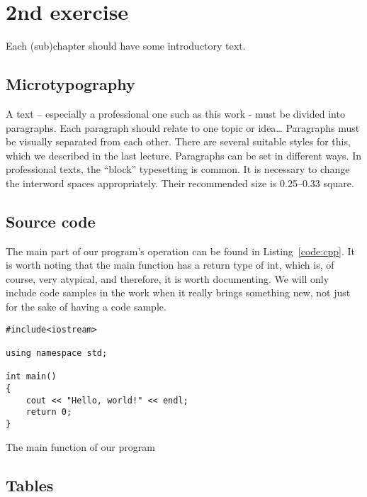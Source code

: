 \chapter{2nd exercise}

Each (sub)chapter should have some introductory text.

\section{Microtypography}

A text -- especially a professional one such as this work - must be divided into paragraphs. Each paragraph should relate to one topic or idea\dots{} Paragraphs must be visually separated from each other. There are several suitable styles for this, which we described in  the last lecture. Paragraphs can be set in different ways. In professional texts, the ``block'' typesetting is common. It is necessary to change the interword spaces appropriately. Their recommended size is 0.25--0.33 square.


\section{Source code}

The main part of our program's operation can be found in Listing~\ref{code:cpp}. It is worth noting that the main function has a return type of int, which is, of course, very atypical, and therefore, it is worth documenting. We will only include code samples in the work when it really brings something new, not just for the sake of having a code sample.

\begin{listing}
    \begin{verbatim}
#include<iostream>

using namespace std;

int main()
{
    cout << "Hello, world!" << endl;
    return 0;
}
    \end{verbatim}
    \caption{The main function of our program}
    \label{code:cpp}
\end{listing}

\section{Tables}


